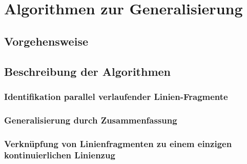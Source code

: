 \chapter{Algorithmen zur Generalisierung}

\section{Vorgehensweise}

\section{Beschreibung der Algorithmen}

\subsection{Identifikation parallel verlaufender Linien-Fragmente}

\subsection{Generalisierung durch Zusammenfassung}

\subsection{Verknüpfung von Linienfragmenten zu einem einzigen kontinuierlichen Linienzug}

